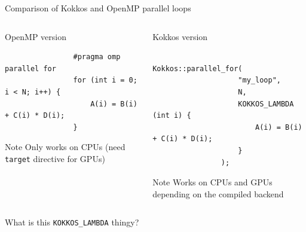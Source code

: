 \documentclass[aspectratio=169]{beamer}
\begin{document}
\begin{frame}[fragile]{Comparison of Kokkos and OpenMP parallel loops}
    \begin{columns}[T]
        \begin{column}{0.5\linewidth}
            OpenMP version

            \begin{verbatim}
                #pragma omp parallel for
                for (int i = 0; i < N; i++) {
                    A(i) = B(i) + C(i) * D(i);
                }
            \end{verbatim}
            \begin{block}{Note}
                Only works on CPUs (need \texttt{target} directive for GPUs)
            \end{block}
        \end{column}
        \begin{column}{0.5\linewidth}
            Kokkos version

            \begin{verbatim}
                Kokkos::parallel_for(
                    "my_loop",
                    N,
                    KOKKOS_LAMBDA (int i) {
                        A(i) = B(i) + C(i) * D(i);
                    }
                );
            \end{verbatim}
            \begin{block}{Note}
                Works on CPUs and GPUs depending on the compiled backend
            \end{block}
        \end{column}
    \end{columns}

    \vspace{0.5em}

     What is this \texttt{KOKKOS\_LAMBDA} thingy?
\end{frame}

\end{document}
